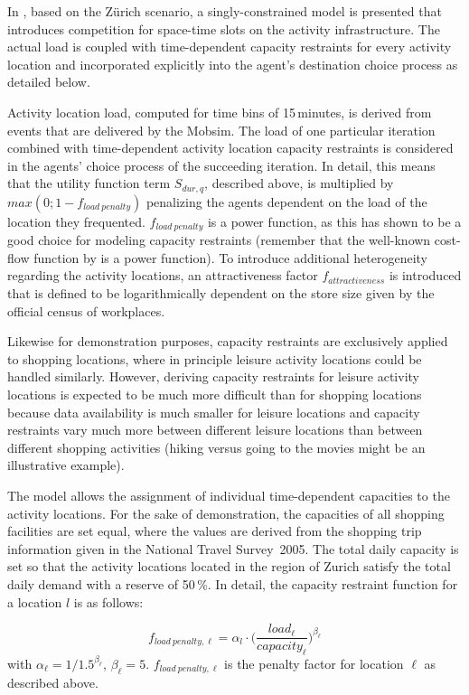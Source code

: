 In \citet[][]{HorniEtAl_TRR_2009}, based on the Zürich scenario, a singly-constrained model is presented that introduces competition for space-time slots on the activity infrastructure. The actual load is coupled with time-dependent capacity restraints for every activity location and incorporated explicitly into the agent's destination choice process as detailed below. 

Activity location load, computed for time bins of 15\,minutes, is derived from events that are delivered by the Mobsim. The load of one particular iteration combined with time-dependent activity location capacity restraints is considered in the agents' choice process of the succeeding iteration. In detail, this means that the utility function term $S_{dur,q}$, described above, is multiplied by $max(0; 1 - f_{load\ penalty})$ penalizing the agents dependent on the load of the location they frequented. $f_{load\ penalty}$ is a power function, as this has shown to be a good choice for modeling capacity restraints (remember that the well-known cost-flow function by \citet[][]{TA_manual_1964} is a power function). To introduce additional heterogeneity regarding the activity locations, an attractiveness factor $f_{attractiveness}$ is introduced that is defined to be logarithmically dependent on the store size given by the official census of workplaces.

Likewise for demonstration purposes, capacity restraints are exclusively applied to shopping locations, where in principle leisure activity locations could be handled similarly. However, deriving capacity restraints for leisure activity locations is expected to be much more difficult than for shopping locations because data availability is much smaller for leisure locations and capacity restraints vary much more between different leisure locations than between different shopping activities (hiking versus going to the movies might be an illustrative example).

The model allows the assignment of individual time-dependent capacities to the activity locations. For the sake of demonstration, the capacities of all shopping facilities are set equal, where the values are derived from the shopping trip information given in the National Travel Survey~2005. The total daily capacity is set so that the activity locations located in the region of Zurich satisfy the total daily demand with a reserve of 50\,\%. In detail, the capacity restraint function for a location $l$ is as follows:

\[
f_{load\ penalty, \ell}=\alpha_l \cdot \Bigg(\frac{load_{\ell}}{capacity_{\ell}}\Bigg)^{\beta_\ell}
\]
with $\alpha_\ell=1/1.5^{\beta_\ell}$, $\beta_\ell=5$. $f_{load\ penalty, \ell}$ is the penalty factor for location $\ell$ as described above.

